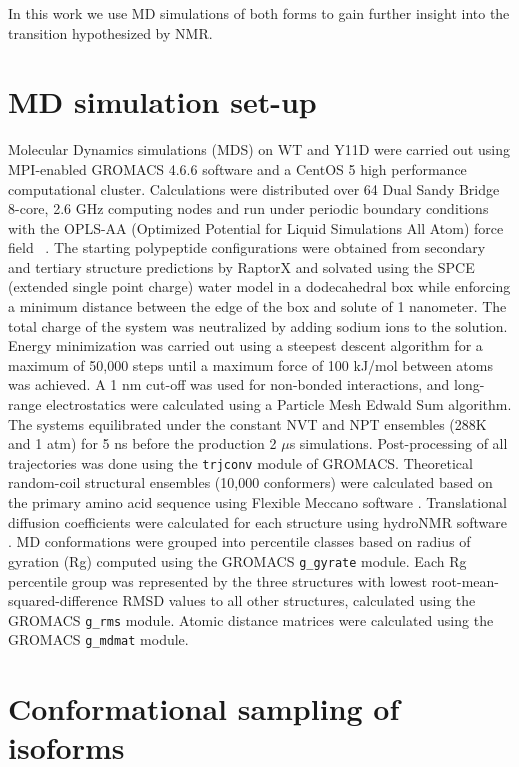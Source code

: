 In this work we use MD simulations of both \gct forms to gain further insight into the transition hypothesized by NMR.  

\section{MD simulation set-up}

Molecular Dynamics simulations (MDS) on WT and Y11D \gct were carried out using MPI-enabled GROMACS 4.6.6 software\cite{hess2008gromacs} and a CentOS 5 high performance computational cluster. Calculations were distributed over 64 Dual Sandy Bridge 8-core, 2.6 GHz computing nodes and run under periodic boundary conditions with the OPLS-AA (Optimized Potential for Liquid Simulations All Atom) force field ~\cite{kaminski2001evaluation}.  The starting \gct polypeptide configurations were obtained from secondary and tertiary structure predictions by RaptorX \cite{kallberg2012template} and solvated using the SPCE (extended single point charge) water model in a dodecahedral box while enforcing a minimum distance between the edge of the box and solute of 1 nanometer. The total charge of the system was neutralized by adding sodium ions to the solution. Energy minimization was carried out using a steepest descent algorithm for a maximum of 50,000 steps until a maximum force of 100 kJ/mol between atoms was achieved. A 1 nm cut-off was used for non-bonded interactions, and long-range electrostatics were calculated using a Particle Mesh Edwald Sum algorithm. The systems equilibrated under the constant NVT and NPT ensembles (288K and 1 atm) for 5 ns before the production 2 $\mu$s simulations. Post-processing of all trajectories was done using the \texttt{trjconv} module of GROMACS. Theoretical random-coil structural ensembles (10,000 conformers) were calculated based on the \gct primary amino acid sequence using Flexible Meccano software \cite{ozenne2012flexible}. Translational diffusion coefficients were calculated for each structure using hydroNMR software \cite{de2000hydronmr}. 
MD conformations were grouped into percentile classes based on radius of gyration (Rg) computed using the GROMACS \texttt{g\_gyrate} module. Each Rg percentile group was represented by the three structures with lowest root-mean-squared-difference RMSD values to all other structures, calculated using the GROMACS \texttt{g\_rms} module. Atomic distance matrices were calculated using the GROMACS \texttt{g\_mdmat} module.


\section{Conformational sampling of \gct isoforms}

